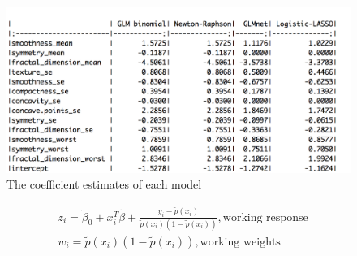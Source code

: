 \documentclass[]{article}
\begin{document}
\begin{figure}[h]

{\centering \includegraphics[width=0.8\linewidth]{table1} 

}

\caption{The coefficient estimates of each model}\label{fig:unnamed-chunk-5}
\end{figure}

\[
\begin{aligned}
& z_i = \tilde{\beta}_0+ x_i^T\tilde{\beta} + \frac{y_i-\tilde{p}(x_i)}{\tilde{p}(x_i)(1-\tilde{p}(x_i))}, \text{working response}\\
& w_i = \tilde{p}(x_i)(1-\tilde{p}(x_i)), \text{working weights}
\end{aligned}
\]
\end{document}
